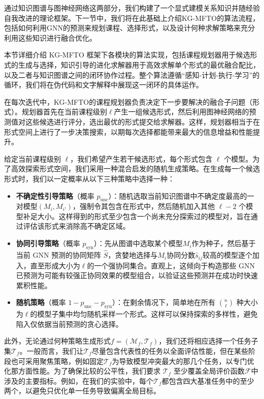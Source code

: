 \documentclass[../main.tex]{subfiles}
\begin{document}
通过知识图谱与图神经网络这两部分，我们构建了一个显式建模关系知识并随经验自我改进的理论框架。下一节中，我们将在此基础上介绍KG-MFTO的算法流程，包括如何利用GNN的预测来规划课程、选择形式，以及设计何种求解策略来充分利用这些知识进行融合优化。


本节详细介绍 KG-MFTO 框架下各模块的算法实现，包括课程规划器用于候选形式的生成与选择，知识引导的进化求解器用于高效求解单个形式的最优融合配比，以及二者与知识图谱之间的闭环协作过程。整个算法遵循“感知-计划-执行-学习”的循环，我们将在伪代码和文字解释中展现这一闭环的具体运作。

在每次迭代中，KG-MFTO的课程规划器负责决定下一步要解决的融合子问题（形式）。规划器首先在当前课程级别$\ell$产生一组候选形式，然后利用图神经网络的预测值对这些候选进行评分，选出最优的形式提交给求解器。这样，规划器相当于在形式空间上进行了一步决策搜索，以期每次选择都能带来最大的信息增益和性能提升。


给定当前课程级别 $\ell$，我们希望产生若干候选形式，每个形式包含 $\ell$ 个模型。为了高效探索形式空间，我们采用一种混合启发的随机生成策略。在生成每一个候选形式时，我们以一定概率从以下三种策略中选择一种：

\begin{itemize}[leftmargin=3\ccwd]
	\item \textbf{不确定性引导策略}（概率 $p_{\text{unc}}$）：随机选取当前知识图谱中不确定度最高的一对模型$(M_i, M_{i'})$，强制令其包含在形式中，然后随机加入其他 $\ell-2$ 个模型补足大小。这样得到的形式至少包含一个尚未充分探索过的模型对，旨在通过评估该形式来消除高不确定区域。
	\item \textbf{协同引导策略}（概率 $p_{\text{syn}}$）：先从图谱中选取某个模型$M_i$作为种子，然后基于当前 GNN 预测的协同矩阵 $\hat{S}$，贪婪地选择与$M_i$协同分数$\hat{s}_{ij}$较高的模型逐个加入，直至形成大小为$\ell$的一个强协同集合。直观上，这倾向于构造那些 GNN 已预测为可能有较强正协同效果的模型组合，以验证这些预测并在成功时快速累积性能。
	\item \textbf{随机策略}（概率 $1 - p_{\text{unc}} - p_{\text{syn}}$）：在剩余情况下，简单地在所有 $\binom{n}{\ell}$ 种大小为$\ell$的模型子集中均匀随机采样一个形式。这样可以保持探索的多样性，避免陷入仅依据当前预测的贪心选择。
\end{itemize}

此外，无论通过何种策略生成形式$f=(\mathcal{M}_f,\mathcal{T}_f)$，我们还将相应选择一个任务子集$\mathcal{T}_f$。一般而言，我们让$\mathcal{T}_f$尽量包含代表性的任务以全面评估性能，但在某些阶段也可采用聚焦策略，例如固定$\mathcal{T}_f$为导致模型冲突最大的那几个任务，以专门优化那方面性能。为了确保比较的公平性，我们要求 $\mathcal{T}_f$ 至少覆盖全局评价函数$\mathcal{F}$中涉及的主要指标。例如，在我们的实验中，每个$\mathcal{T}_f$都包含四大基准任务中的至少两个，以避免只优化单一任务导致偏离全局目标。
\end{document}
